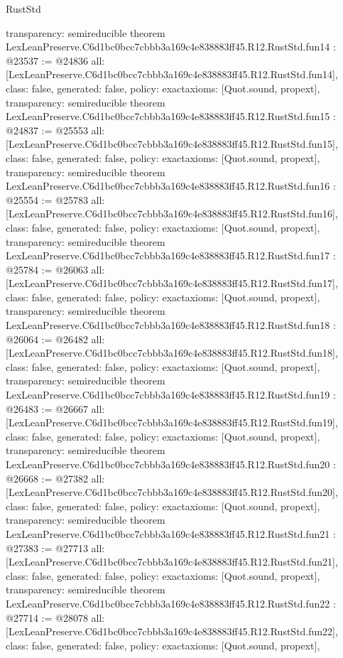 \begin{lexlean}{RustStd}
\begin{coremodule}
{  transparency: semireducible
}
theorem LexLeanPreserve.C6d1bc0bcc7cbbb3a169c4e838883ff45.R12.RustStd.fun14 : @23537 := @24836 {
  all: [LexLeanPreserve.C6d1bc0bcc7cbbb3a169c4e838883ff45.R12.RustStd.fun14],
  class: false,
  generated: false,
  policy: exact{axioms: [Quot.sound, propext]},
  transparency: semireducible
}
theorem LexLeanPreserve.C6d1bc0bcc7cbbb3a169c4e838883ff45.R12.RustStd.fun15 : @24837 := @25553 {
  all: [LexLeanPreserve.C6d1bc0bcc7cbbb3a169c4e838883ff45.R12.RustStd.fun15],
  class: false,
  generated: false,
  policy: exact{axioms: [Quot.sound, propext]},
  transparency: semireducible
}
theorem LexLeanPreserve.C6d1bc0bcc7cbbb3a169c4e838883ff45.R12.RustStd.fun16 : @25554 := @25783 {
  all: [LexLeanPreserve.C6d1bc0bcc7cbbb3a169c4e838883ff45.R12.RustStd.fun16],
  class: false,
  generated: false,
  policy: exact{axioms: [Quot.sound, propext]},
  transparency: semireducible
}
theorem LexLeanPreserve.C6d1bc0bcc7cbbb3a169c4e838883ff45.R12.RustStd.fun17 : @25784 := @26063 {
  all: [LexLeanPreserve.C6d1bc0bcc7cbbb3a169c4e838883ff45.R12.RustStd.fun17],
  class: false,
  generated: false,
  policy: exact{axioms: [Quot.sound, propext]},
  transparency: semireducible
}
theorem LexLeanPreserve.C6d1bc0bcc7cbbb3a169c4e838883ff45.R12.RustStd.fun18 : @26064 := @26482 {
  all: [LexLeanPreserve.C6d1bc0bcc7cbbb3a169c4e838883ff45.R12.RustStd.fun18],
  class: false,
  generated: false,
  policy: exact{axioms: [Quot.sound, propext]},
  transparency: semireducible
}
theorem LexLeanPreserve.C6d1bc0bcc7cbbb3a169c4e838883ff45.R12.RustStd.fun19 : @26483 := @26667 {
  all: [LexLeanPreserve.C6d1bc0bcc7cbbb3a169c4e838883ff45.R12.RustStd.fun19],
  class: false,
  generated: false,
  policy: exact{axioms: [Quot.sound, propext]},
  transparency: semireducible
}
theorem LexLeanPreserve.C6d1bc0bcc7cbbb3a169c4e838883ff45.R12.RustStd.fun20 : @26668 := @27382 {
  all: [LexLeanPreserve.C6d1bc0bcc7cbbb3a169c4e838883ff45.R12.RustStd.fun20],
  class: false,
  generated: false,
  policy: exact{axioms: [Quot.sound, propext]},
  transparency: semireducible
}
theorem LexLeanPreserve.C6d1bc0bcc7cbbb3a169c4e838883ff45.R12.RustStd.fun21 : @27383 := @27713 {
  all: [LexLeanPreserve.C6d1bc0bcc7cbbb3a169c4e838883ff45.R12.RustStd.fun21],
  class: false,
  generated: false,
  policy: exact{axioms: [Quot.sound, propext]},
  transparency: semireducible
}
theorem LexLeanPreserve.C6d1bc0bcc7cbbb3a169c4e838883ff45.R12.RustStd.fun22 : @27714 := @28078 {
  all: [LexLeanPreserve.C6d1bc0bcc7cbbb3a169c4e838883ff45.R12.RustStd.fun22],
  class: false,
  generated: false,
  policy: exact{axioms: [Quot.sound, propext]},
}
\end{coremodule}
\end{lexlean}
